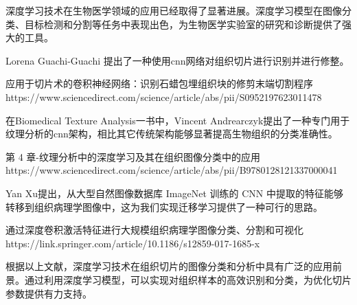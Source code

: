 
深度学习技术在生物医学领域的应用已经取得了显著进展。深度学习模型在图像分类、目标检测和分割等任务中表现出色，为生物医学实验室的研究和诊断提供了强大的工具。

Lorena Guachi-Guachi 提出了一种使用cnn网络对组织切片进行识别并进行修整。

应用于切片术的卷积神经网络：识别石蜡包埋组织块的修剪末端切割程序
https://www.sciencedirect.com/science/article/abs/pii/S0952197623011478


在Biomedical Texture Analysis一书中，Vincent Andrearczyk提出了一种专门用于纹理分析的cnn架构，相比其它传统架构能够显著提高生物组织的分类准确性。

第 4 章-纹理分析中的深度学习及其在组织图像分类中的应用
https://www.sciencedirect.com/science/article/abs/pii/B9780128121337000041


Yan Xu提出，从大型自然图像数据库 ImageNet 训练的 CNN 中提取的特征能够转移到组织病理学图像中，这为我们实现迁移学习提供了一种可行的思路。

通过深度卷积激活特征进行大规模组织病理学图像分类、分割和可视化
https://link.springer.com/article/10.1186/s12859-017-1685-x

根据以上文献，深度学习技术在组织切片的图像分类和分析中具有广泛的应用前景。通过利用深度学习模型，可以实现对组织样本的高效识别和分类，为优化切片参数提供有力支持。





\FloatBarrier %
